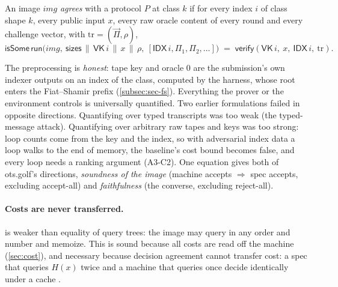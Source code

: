 \begin{definition}\label{def:proto-agrees}
An image $\mathit{img}$ \emph{agrees} with a protocol $P$ at class $k$ if for every index $i$ of
class shape $k$, every public input $x$, every raw oracle content of every  round and
every challenge vector, with $\mathrm{tr}=(\vec\Pi,\rho)$,
\[ \mathsf{isSome}\,\mathsf{run}\bigl(\mathit{img},\ \mathsf{sizes}\,\|\,\mathsf{VK}\,i\,\|\,x\,\|\,\rho,\
   [\mathsf{IDX}\,i,\Pi_1,\Pi_2,\dots]\bigr)
   \;=\; \mathsf{verify}(\mathsf{VK}\,i,\ x,\ \mathsf{IDX}\,i,\ \mathrm{tr}). \]
\end{definition}

\noindent The preprocessing is \emph{honest}: tape key and oracle 0 are the submission's own
indexer outputs on an index of the class, computed by the harness, whose root enters the
Fiat--Shamir prefix (\cref{subsec:sec-fs}). Everything the prover or the environment controls is
universally quantified. Two earlier formulations failed in opposite directions. Quantifying over
typed transcripts was too weak (the typed-message attack). Quantifying over arbitrary raw tapes and
keys was too strong: loop counts come from the key and the index, so with adversarial index data a
loop walks to the end of memory, the baseline's cost bound becomes false, and every loop needs a
ranking argument (A3-C2). One equation gives both of ots.golf's directions, \emph{soundness of the
image} (machine accepts $\Rightarrow$ spec accepts, excluding accept-all) and \emph{faithfulness}
(the converse, excluding reject-all).

\paragraph{Costs are never transferred.}  is weaker than equality of query trees: the
image may query in any order and number and memoize. This is sound because all costs are read off
the machine (\cref{sec:cost}), and necessary because decision agreement cannot transfer cost: a
spec that queries $H(x)$ twice and a machine that queries once decide identically under a cache
\cite{otsgolf2026}.

